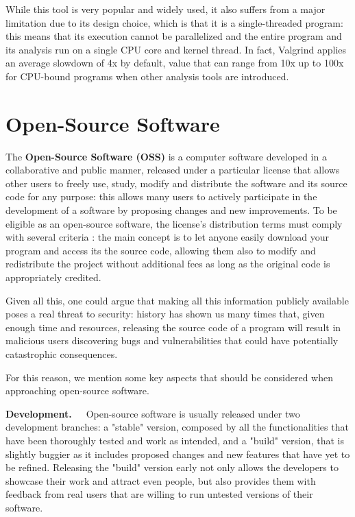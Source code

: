 While this tool is very popular and widely used, it also suffers from a major limitation due to its design choice, which is that it is a single-threaded program: this means that its execution cannot be parallelized and the entire program and its analysis run on a single CPU core and kernel thread. In fact, Valgrind applies an average slowdown of 4x by default, value that can range from 10x up to 100x for CPU-bound programs when other analysis tools are introduced. \cite{Valgrind_1}





\newpage
\section{Open-Source Software}
The \textbf{Open-Source Software (OSS)} is a computer software developed in a collaborative and public manner, released under a particular license that allows other users to freely use, study, modify and distribute the software and its source code for any purpose: this allows many users to actively participate in the development of a software by proposing changes and new improvements.
To be eligible as an open-source software, the license's distribution terms must comply with several criteria \cite{osd}: the main concept is to let anyone easily download your program and access its the source code, allowing them also to modify and redistribute the project without additional fees as long as the original code is appropriately credited. 

Given all this, one could argue that making all this information publicly available poses a real threat to security: history has shown us many times that, given enough time and resources, releasing the source code of a program will result in malicious users discovering bugs and vulnerabilities that could have potentially catastrophic consequences.

For this reason, we mention some key aspects that should be considered when approaching open-source software.

\textbf{Development.}\ \ \ Open-source software is usually released under two development branches: a "stable" version, composed by all the functionalities that have been thoroughly tested and work as intended, and a "build" version, that is slightly buggier as it includes proposed changes and new features that have yet to be refined. Releasing the "build" version early not only allows the developers to showcase their work and attract even people, but also provides them with feedback from real users that are willing to run untested versions of their software.

